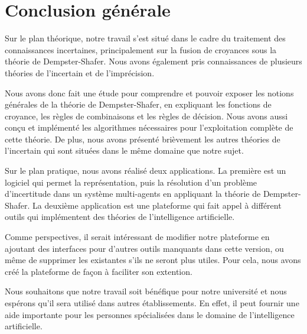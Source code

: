 {}
\chapter*{Conclusion générale}

Sur le plan théorique, notre travail s'est situé dans le cadre du traitement des connaissances incertaines,
principalement sur la fusion de croyances sous la théorie de Dempster-Shafer. Nous avons également pris connaissances
de plusieurs théories de l'incertain et de l'imprécision.

Nous avons donc fait une étude pour comprendre et pouvoir exposer les notions générales de la théorie de Dempster-Shafer,
en expliquant les fonctions de croyance, les règles de combinaisons et les règles de décision. 
Nous avons aussi conçu et implémenté les algorithmes nécessaires pour l'exploitation complète de cette théorie. De plus,
nous avons présenté brièvement les autres théories de l'incertain qui sont situées dans le même domaine que notre sujet.

Sur le plan pratique, nous avons réalisé deux applications. La première est un logiciel qui permet la représentation,
puis la résolution d'un problème d'incertitude dans un système multi-agents en appliquant la théorie de Dempster-Shafer.
La deuxième application est une plateforme qui fait appel à différent outils qui implémentent des théories de
l'intelligence artificielle.

Comme perspectives, il serait intéressant de modifier notre plateforme en ajoutant des interfaces pour d'autres outils
manquants dans cette version, ou même de supprimer les existantes s'ils ne seront plus utiles. Pour cela, nous avons créé
la plateforme de façon à faciliter son extention.

Nous souhaitons que notre travail soit bénéfique pour notre université et nous espérons qu'il sera utilisé dans autres
établissements. En effet, il peut fournir une aide importante pour les personnes spécialisées dans le domaine de
l'intelligence artificielle.